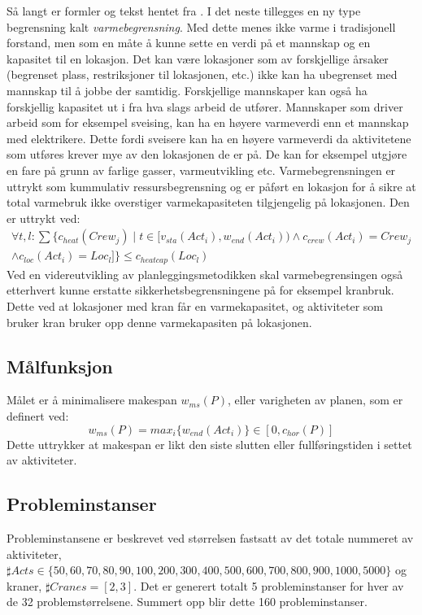 Så langt er formler og tekst hentet fra \cite{tvedtbezem}. I det neste tillegges en ny type begrensning kalt \textit{varmebegrensning}. Med dette menes ikke varme i tradisjonell forstand, men som en måte å kunne sette en verdi på et mannskap og en kapasitet til en lokasjon. Det kan være lokasjoner som av forskjellige årsaker (begrenset plass, restriksjoner til lokasjonen, etc.) ikke kan ha ubegrenset med mannskap til å jobbe der samtidig. Forskjellige mannskaper kan også ha forskjellig kapasitet ut i fra hva slags arbeid de utfører. Mannskaper som driver arbeid som for eksempel sveising, kan ha en høyere varmeverdi enn et mannskap med elektrikere. Dette fordi sveisere kan ha en høyere varmeverdi da aktivitetene som utføres krever mye av den lokasjonen de er på. De kan for eksempel utgjøre en fare på grunn av farlige gasser, varmeutvikling etc. Varmebegrensningen er uttrykt som kummulativ ressursbegrensning og er påført en lokasjon for å sikre at total varmebruk ikke overstiger varmekapasiteten tilgjengelig på lokasjonen. Den er uttrykt ved:
\begin{equation}
\begin{split}
\forall t,l: \sum\{c_{heat}(Crew_j) \mid t \in [ v_{sta}(Act_{i}), w_{end}(Act_{i})) \wedge c_{crew}(Act_{i}) = Crew_{j} \\
\wedge c_{loc}(Act_{i}) = Loc_{l} ] \} \le c_{heatcap}(Loc_{l})
\end{split}
\end{equation}
Ved en videreutvikling av planleggingsmetodikken skal varmebegrensingen også etterhvert kunne erstatte sikkerhetsbegrensningene på for eksempel kranbruk. Dette ved at lokasjoner med kran får en varmekapasitet, og aktiviteter som bruker kran bruker opp denne varmekapasiten på lokasjonen.

\subsection{Målfunksjon}
\label{sec:makespandef}
Målet er å minimalisere makespan $ w_{ms}(P) $, eller varigheten av planen, som er definert ved:
\begin{equation}
w_{ms}(P) = max_{i} \{ w_{end}(Act_{i}) \} \in [0,c_{hor}(P)]
\end{equation}
Dette uttrykker at makespan er likt den siste slutten eller fullføringstiden i settet av aktiviteter.

\subsection{Probleminstanser}
Probleminstansene er beskrevet ved størrelsen fastsatt av det totale nummeret av aktiviteter, $ \sharp Acts \in \{ 50,60, 70, 80, 90, 100, 200, 300, 400, 500, 600, 700, 800, 900, 1000, 5000 \} $ og kraner, $ \sharp Cranes = [2,3] $. Det er generert totalt 5 probleminstanser for hver av de 32 problemstørrelsene. Summert opp blir dette 160 probleminstanser.

